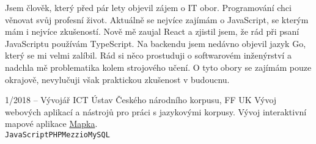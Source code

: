 \documentclass[9pt]{developercv} %
\begin{document}

\begin{minipage}[t]{0.4\textwidth} %
	\vspace{-\baselineskip} %
	
	Jsem člověk, který před pár lety objevil zájem o IT obor. Programování chci věnovat
	svůj profesní život. Aktuálně se nejvíce zajímám o JavaScript, se kterým
	mám i nejvíce zkušeností. Nově mě zaujal React a zjistil jsem, že rád při psaní JavaScriptu
	používám TypeScript.
	Na backendu jsem nedávno objevil jazyk Go, který se mi velmi zalíbil. Rád si něco prostuduji
	o softwarovém inženýrství a nadchla mě problematika kolem strojového učení. O tyto
	obory se zajímám pouze okrajově, nevylučuji však praktickou zkušenost v budoucnu.
\end{minipage}
\hfill %
\begin{minipage}[t]{0.5\textwidth} %
	\vspace{-\baselineskip} %
	\begin{barchart}{5.5}
	\end{barchart}
\end{minipage}

\begin{center}
\end{center}



\begin{entrylist}
	\entry
		{1/2018 -- }
		{Vývojář ICT}
		{Ústav Českého národního korpusu, FF UK}
		{Vývoj webových aplikací a nástrojů pro práci s jazykovými korpusy. Vývoj interaktivní
		mapové aplikace \href{https://korpus.cz/mapka/}{Mapka}.\\
		\texttt{JavaScript}\slashsep\texttt{PHP}\slashsep\texttt{Mezzio}\slashsep\texttt{MySQL}}
\end{entrylist}
\end{document}
